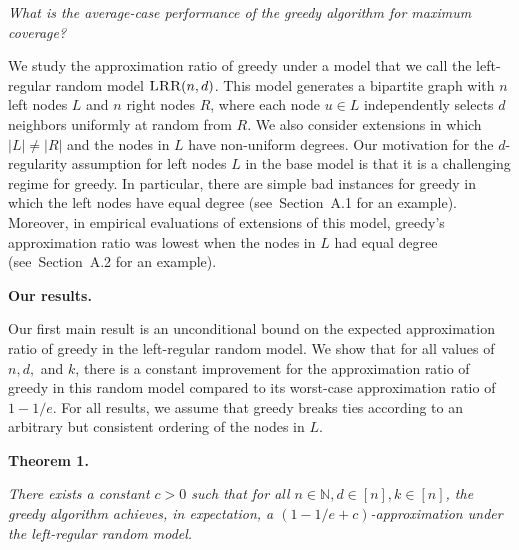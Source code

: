 \emph{What is the average-case performance of the greedy algorithm for maximum coverage? }\par




We study the approximation ratio of greedy under a model that we call the left-regular random model $\textsc{LRR}(n,d)$. This model generates a bipartite graph with $n$ left nodes $L$ and $n$ right nodes $R$, where each node $u\in L$ independently selects $d$ neighbors uniformly at random from $R$. We also consider extensions in which $|L|\neq|R|$ and the nodes in $L$ have non-uniform degrees. Our motivation for the $d$-regularity assumption for left nodes $L$ in the base model is that it is a challenging regime for greedy. In particular, there are simple bad instances for greedy in which the left nodes have equal degree (see Section A.1 for an example). Moreover, in empirical evaluations of extensions of this model, greedy’s approximation ratio was lowest when the nodes in $L$ had equal degree (see Section A.2 for an example).\par




\par\medskip\noindent\textbf{Our results.}\par




Our first main result is an unconditional bound on the expected approximation ratio of greedy in the left-regular random model. We show that for all values of $n,d,$ and $k$, there is a constant improvement for the approximation ratio of greedy in this random model compared to its worst-case approximation ratio of $1-1/e$. For all results, we assume that greedy breaks ties according to an arbitrary but consistent ordering of the nodes in $L$.\par





\par\medskip\noindent\textbf{\textbf{Theorem 1}\textbf{.}}\par



\emph{There exists a constant $c>0$ such that for all $n\in\mathbb{N},d\in[n],k\in[n]$, the greedy algorithm achieves, in expectation, a $(1-1/e+c)$-approximation under the left-regular random model.}\par






